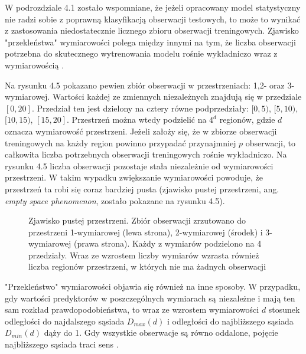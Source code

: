 \documentclass[notitlepage]{report}
\begin{document}
W podrozdziale 4.1 zostało wspomniane, że jeżeli opracowany model statystyczny nie radzi sobie z poprawną klasyfikacją obserwacji testowych, to może to wynikać z zastosowania niedostatecznie licznego zbioru obserwacji treningowych. Zjawisko "przekleństwa" wymiarowości polega między innymi na tym, że liczba obserwacji potrzebna do skutecznego wytrenowania modelu rośnie wykładniczo wraz z wymiarowością \cite{islr} \cite{eslii}.

Na rysunku 4.5 pokazano pewien zbiór obserwacji w przestrzeniach: 1,2- oraz 3-wymiarowej. Wartości każdej ze zmiennych niezależnych znajdują się w przedziale $[0,20]$. Przedział ten jest dzielony na cztery równe podprzedziały: $[0,5)$, $[5,10)$, $[10,15)$, $[15,20]$. Przestrzeń można wtedy podzielić na $4^d$ regionów, gdzie $d$ oznacza wymiarowość przestrzeni. Jeżeli założy się, że w zbiorze obserwacji treningowych na każdy region powinno przypadać przynajmniej $p$ obserwacji, to całkowita liczba potrzebnych obserwacji treningowych rośnie wykładniczo. Na rysunku 4.5 liczba obserwacji pozostaje stała niezależnie od wymiarowości przestrzeni. W takim wypadku zwiększanie wymiarowości powoduje, że przestrzeń ta robi się coraz bardziej pusta (zjawisko pustej przestrzeni, ang. \textit{empty space phenomenon}, zostało pokazane na rysunku 4.5). 

\begin{figure}[H]
	\centering
	\caption{Zjawisko pustej przestrzeni. Zbiór obserwacji zrzutowano do przestrzeni 1-wymiarowej (lewa strona), 2-wymiarowej (środek) i 3-wymiarowej (prawa strona). Każdy z wymiarów podzielono na 4 przedziały. Wraz ze wzrostem liczby wymiarów wzrasta również liczba regionów przestrzeni, w których nie ma żadnych obserwacji \cite{curseimg}}
\end{figure}

"Przekleństwo" wymiarowości objawia się również na inne sposoby. W przypadku, gdy wartości predyktorów w poszczególnych wymiarach są niezależne i mają ten sam rozkład prawdopodobieństwa, to wraz ze wzrostem wymiarowości $d$ stosunek odległości do najdalszego sąsiada $D_{max}(d)$ i odległości do najbliższego  sąsiada $D_{min}(d)$ dąży do 1. Gdy wszystkie obserwacje są równo oddalone, pojęcie najbliższego sąsiada traci sens \cite{beyer}.
\end{document}
